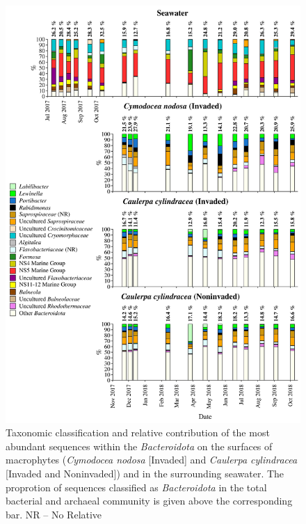 \documentclass[12pt,]{article}
\begin{document}
\begin{figure}[H]

{\centering \includegraphics[width=0.85\linewidth]{../results/figures/bacteroidota_bar_plot} 

}

\caption{Taxonomic classification and relative contribution of the most abundant sequences within the \textit{Bacteroidota} on the surfaces of macrophytes (\textit{Cymodocea nodosa} [Invaded] and \textit{Caulerpa cylindracea} [Invaded and Noninvaded]) and in the surrounding seawater. The proprotion of sequences classified as \textit{Bacteroidota} in the total bacterial and archaeal community is given above the corresponding bar. NR -- No Relative\label{bactero}}\label{fig:unnamed-chunk-6}
\end{figure}
\end{document}

